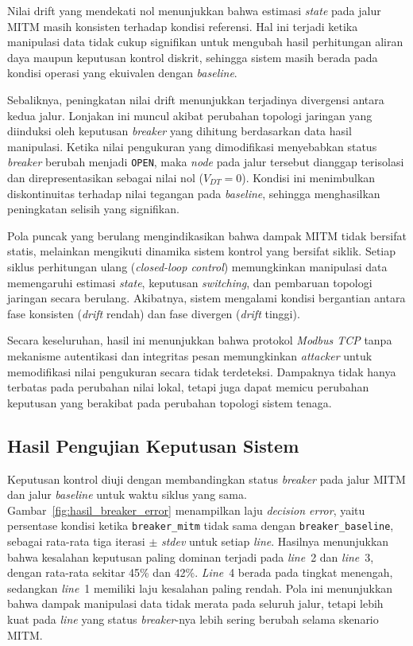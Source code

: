 Nilai drift yang mendekati nol menunjukkan bahwa estimasi \textit{state} pada jalur \ac{MITM} masih konsisten terhadap kondisi referensi. Hal ini terjadi ketika manipulasi data tidak cukup signifikan untuk mengubah hasil perhitungan aliran daya maupun keputusan kontrol diskrit, sehingga sistem masih berada pada kondisi operasi yang ekuivalen dengan \textit{baseline}.

Sebaliknya, peningkatan nilai drift menunjukkan terjadinya divergensi antara kedua jalur. Lonjakan ini muncul akibat perubahan topologi jaringan yang diinduksi oleh keputusan \textit{breaker} yang dihitung berdasarkan data hasil manipulasi. Ketika nilai pengukuran yang dimodifikasi menyebabkan status \textit{breaker} berubah menjadi \texttt{OPEN}, maka \textit{node} pada jalur tersebut dianggap terisolasi dan direpresentasikan sebagai nilai nol ($V_{DT} = 0$). Kondisi ini menimbulkan diskontinuitas terhadap nilai tegangan pada \textit{baseline}, sehingga menghasilkan peningkatan selisih yang signifikan.

Pola puncak yang berulang mengindikasikan bahwa dampak \ac{MITM} tidak bersifat statis, melainkan mengikuti dinamika sistem kontrol yang bersifat siklik. Setiap siklus perhitungan ulang (\textit{closed-loop control}) memungkinkan manipulasi data memengaruhi estimasi \textit{state}, keputusan \textit{switching}, dan pembaruan topologi jaringan secara berulang. Akibatnya, sistem mengalami kondisi bergantian antara fase konsisten (\textit{drift} rendah) dan fase divergen (\textit{drift} tinggi).

Secara keseluruhan, hasil ini menunjukkan bahwa protokol \textit{Modbus TCP} tanpa mekanisme autentikasi dan integritas pesan memungkinkan \textit{attacker} untuk memodifikasi nilai pengukuran secara tidak terdeteksi. Dampaknya tidak hanya terbatas pada perubahan nilai lokal, tetapi juga dapat memicu perubahan keputusan yang berakibat pada perubahan topologi sistem tenaga.

\subsection{Hasil Pengujian Keputusan Sistem}
\label{subsec:hasil_pengujian_keputusan_sistem}
Keputusan kontrol diuji dengan membandingkan status \textit{breaker} pada jalur \ac{MITM} dan jalur \textit{baseline} untuk waktu siklus yang sama. Gambar~\ref{fig:hasil_breaker_error} menampilkan laju \textit{decision error}, yaitu persentase kondisi ketika \texttt{breaker\_mitm} tidak sama dengan \texttt{breaker\_baseline}, sebagai rata-rata tiga iterasi $\pm$ \textit{stdev} untuk setiap \textit{line}. Hasilnya menunjukkan bahwa kesalahan keputusan paling dominan terjadi pada \textit{line}~2 dan \textit{line}~3, dengan rata-rata sekitar 45\% dan 42\%. \textit{Line}~4 berada pada tingkat menengah, sedangkan \textit{line}~1 memiliki laju kesalahan paling rendah. Pola ini menunjukkan bahwa dampak manipulasi data tidak merata pada seluruh jalur, tetapi lebih kuat pada \textit{line} yang status \textit{breaker}-nya lebih sering berubah selama skenario \ac{MITM}.

